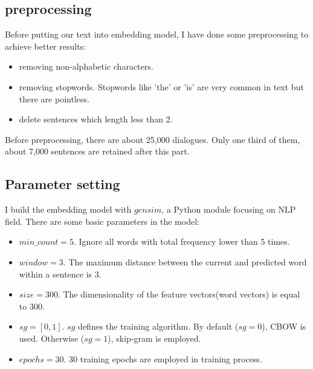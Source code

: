 \documentclass[a4paper,10pt]{article}
\begin{document}
\subsection{preprocessing}
Before putting our text into embedding model, I have done some preprocessing to achieve better results:
    \begin{itemize}
      \item  removing non-alphabetic characters.
      \item  removing stopwords. Stopwords like 'the' or 'is' are very common in text but there are pointless.
      \item  delete sentences which length less than 2. 
    \end{itemize}
   
Before preprocessing, there are about 25,000 dialogues. Only one third of them, about 7,000 sentences are retained after this part.
\subsection{Parameter setting}
I build the embedding model with $gensim$, a Python module focusing on NLP field.
There are some basic parameters in the model:
    \begin{itemize}
        \item  \textbf{$min\_count=5$}. Ignore all words with total frequency lower than 5 times.
        \item  \textbf{$window=3$}. The maximum distance between the current and predicted word within a sentence is 3.
        \item  \textbf{$size=300$}. The dimensionality of the feature vectors(word vectors) is equal to 300.
        \item  \textbf{$sg=[0,1]$}. $sg$ defines the training algorithm. By default ($sg=0$), CBOW is used. Otherwise ($sg=1$), skip-gram is employed.
        \item  \textbf{$epochs=30$}. 30 training epochs are employed in training process.
    \end{itemize}
\end{document}
